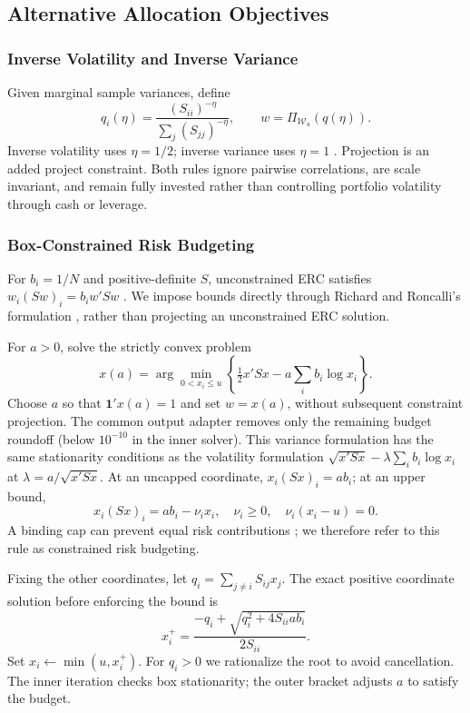 \documentclass[letterpaper,journal]{IEEEtran}
\begin{document}
\subsection{Alternative Allocation Objectives}
\subsubsection{Inverse Volatility and Inverse Variance}
Given marginal sample variances, define
\begin{equation}
 q_i(\eta)=\frac{(S_{ii})^{-\eta}}{\sum_j(S_{jj})^{-\eta}},\qquad
 w=\Pi_{\mathcal W_u}(q(\eta)).
\end{equation}
Inverse volatility uses $\eta=1/2$; inverse variance uses $\eta=1$ \cite{timing}. Projection is an added project constraint. Both rules ignore pairwise correlations, are scale invariant, and remain fully invested rather than controlling portfolio volatility through cash or leverage.

\subsubsection{Box-Constrained Risk Budgeting}\label{sec:riskbudget}
For $b_i=1/N$ and positive-definite $S$, unconstrained ERC satisfies $w_i(Sw)_i=b_iw'Sw$ \cite{erc,ccd}. We impose bounds directly through Richard and Roncalli's formulation \cite[eq.~(11)]{constrainedrb}, rather than projecting an unconstrained ERC solution.

For $a>0$, solve the strictly convex problem
\begin{equation}\label{eq:rb}
 x(a)=\arg\min_{0<x_i\leq u}
 \left\{\tfrac12x'Sx-a\sum_i b_i\log x_i\right\}.
\end{equation}
Choose $a$ so that $\mathbf1'x(a)=1$ and set $w=x(a)$, without subsequent constraint projection. The common output adapter removes only the remaining budget roundoff (below $10^{-10}$ in the inner solver). This variance formulation has the same stationarity conditions as the volatility formulation $\sqrt{x'Sx}-\lambda\sum_i b_i\log x_i$ at $\lambda=a/\sqrt{x'Sx}$. At an uncapped coordinate, $x_i(Sx)_i=ab_i$; at an upper bound,
\begin{equation}
 x_i(Sx)_i=ab_i-\nu_i x_i,\quad
 \nu_i\geq0,\quad \nu_i(x_i-u)=0.
\end{equation}
A binding cap can prevent equal risk contributions \cite[eq.~(17)]{constrainedrb}; we therefore refer to this rule as constrained risk budgeting.

Fixing the other coordinates, let $q_i=\sum_{j\ne i}S_{ij}x_j$. The exact positive coordinate solution before enforcing the bound is
\begin{equation}
 x_i^+=\frac{-q_i+\sqrt{q_i^2+4S_{ii}ab_i}}{2S_{ii}}.
\end{equation}
Set $x_i\leftarrow\min(u,x_i^+)$. For $q_i>0$ we rationalize the root to avoid cancellation. The inner iteration checks box stationarity; the outer bracket adjusts $a$ to satisfy the budget.
\end{document}
